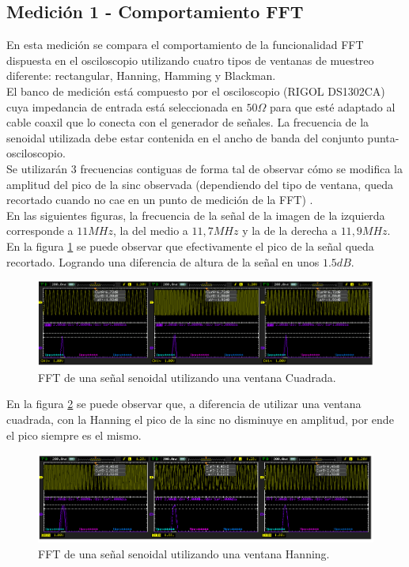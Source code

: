 \documentclass[a4paper,10pt]{article}
\begin{document}
	\subsection{Medición 1 - Comportamiento FFT}
	\indent En esta medición se compara el comportamiento de la funcionalidad
	FFT dispuesta en el osciloscopio utilizando cuatro tipos de ventanas de 
	muestreo diferente: rectangular, Hanning, Hamming y Blackman.\\
	\indent El banco de medici\'on est\'a compuesto por el osciloscopio (RIGOL 
	DS1302CA) cuya impedancia de entrada est\'a seleccionada en $50\Omega$ para 
	que est\'e adaptado al cable coaxil que lo conecta con el generador de 
	señales. La frecuencia de la senoidal utilizada debe estar contenida en el 
	ancho de banda del conjunto punta-osciloscopio. \\
	\indent Se utilizarán 3 frecuencias contiguas de forma tal de observar cómo
	se modifica la amplitud del pico de la sinc observada (dependiendo del tipo 
	de ventana, queda recortado cuando no cae en un punto de medición de la FFT)
	. \\
	\indent En las siguientes figuras, la frecuencia de la señal de la imagen de
	la izquierda corresponde a $11MHz$, la del medio a $11,7MHz$ y la de la 
	derecha a $11,9MHz$.\\
	\indent En la figura \ref{img001} se puede observar que efectivamente el 
	pico de la señal queda recortado. Logrando una diferencia de altura de la 
	señal en unos $1.5dB$.

	\begin{figure}[!htb]
		\centering
		\includegraphics[width=12cm]
		{Imagenes/RectangularWindow.png}
		\caption{FFT de una señal senoidal utilizando una ventana Cuadrada.}
		\label{img001}
	\end{figure}

	\indent En la figura \ref{img002} se puede observar que, a diferencia
	de utilizar una ventana cuadrada, con la Hanning el pico de la sinc no 
	disminuye en amplitud, por ende el pico siempre es el mismo.

	\begin{figure}[!htb]
		\centering
		\includegraphics[width=12cm]
		{Imagenes/HanningWindow.png}
		\caption{FFT de una señal senoidal utilizando una ventana Hanning.}
		\label{img002}
	\end{figure}
\end{document}
